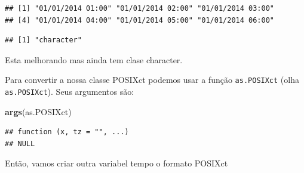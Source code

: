 \documentclass[]{book}
\newenvironment{Shaded}{\begin{snugshade}}{\end{snugshade}}
\newcommand{\KeywordTok}[1]{\textcolor[rgb]{0.13,0.29,0.53}{\textbf{#1}}}
\newcommand{\DataTypeTok}[1]{\textcolor[rgb]{0.13,0.29,0.53}{#1}}
\newcommand{\StringTok}[1]{\textcolor[rgb]{0.31,0.60,0.02}{#1}}
\newcommand{\OperatorTok}[1]{\textcolor[rgb]{0.81,0.36,0.00}{\textbf{#1}}}
\newcommand{\NormalTok}[1]{#1}
\theoremstyle{definition}
\theoremstyle{definition}
\theoremstyle{definition}
\theoremstyle{remark}
\begin{document}
\begin{Shaded}
\end{Shaded}

\begin{verbatim}
## [1] "01/01/2014 01:00" "01/01/2014 02:00" "01/01/2014 03:00"
## [4] "01/01/2014 04:00" "01/01/2014 05:00" "01/01/2014 06:00"
\end{verbatim}

\begin{Shaded}
\end{Shaded}

\begin{verbatim}
## [1] "character"
\end{verbatim}

Esta melhorando mas ainda tem clase character.

Para convertir a nossa classe POSIXct podemos usar a função
\texttt{as.POSIXct} (olha \texttt{as.POSIXct}). Seus argumentos são:

\begin{Shaded}
\begin{Highlighting}[]
\KeywordTok{args}\NormalTok{(as.POSIXct)}
\end{Highlighting}
\end{Shaded}

\begin{verbatim}
## function (x, tz = "", ...) 
## NULL
\end{verbatim}

Então, vamos criar outra variabel tempo o formato POSIXct

\begin{Shaded}
\end{Shaded}
\end{document}

